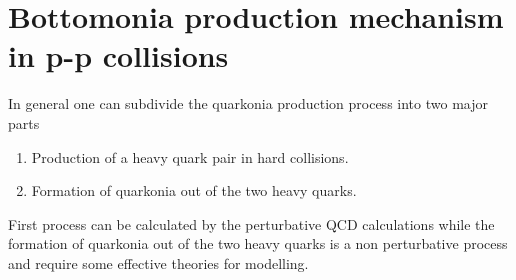 
\section{Bottomonia production mechanism in p-p collisions}
\label{sec:Bottomonia_pp_th}


In general one can subdivide the quarkonia production process into two major parts

\begin{enumerate}
\item Production of a heavy quark pair in hard collisions.
\item Formation of quarkonia out of the two heavy quarks.
\end{enumerate}

First process can be calculated by the perturbative QCD calculations while the 
formation of quarkonia out of the two heavy quarks is a non perturbative process 
and require some effective theories for modelling. 

